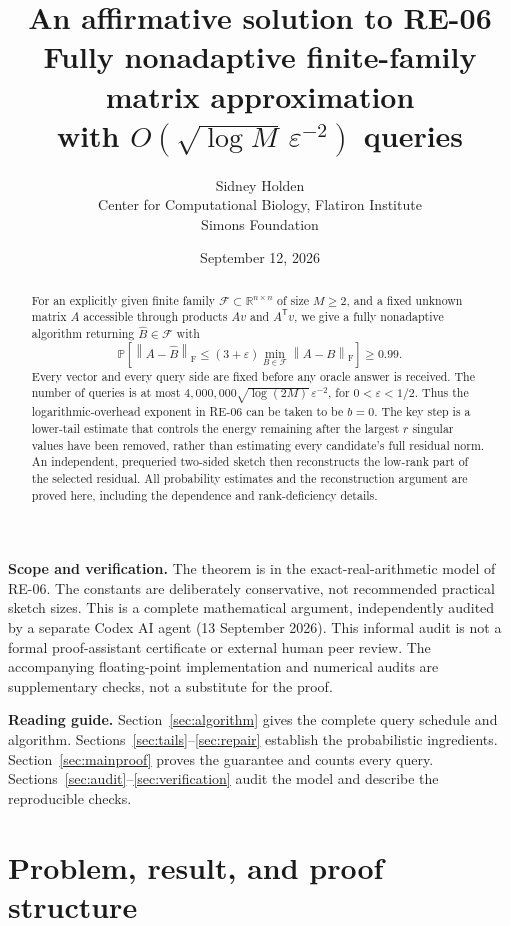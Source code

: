 \documentclass[11pt]{article}
\title{\vspace{-1.5em}\textbf{An affirmative solution to RE-06}\\[0.4em]\large Fully nonadaptive finite-family matrix approximation\\with $O(\sqrt{\log M}\,\varepsilon^{-2})$ queries}
\author{Sidney Holden\\[0.3em]\small Center for Computational Biology, Flatiron Institute\\\small Simons Foundation}
\date{September 12, 2026}
\numberwithin{equation}{section}
\theoremstyle{remark}
\newcommand{\R}{\mathbb R}
\newcommand{\Prob}{\mathbb P}
\newcommand{\F}{\mathcal F}
\newcommand{\norm}[1]{\left\lVert #1\right\rVert_{\mathrm F}}
\newcommand{\T}{\mathsf T}
\begin{document}
\maketitle
\thispagestyle{empty}
\begin{abstract}
For an explicitly given finite family $\F\subset\R^{n\times n}$ of size $M\ge2$, and a fixed unknown matrix $A$ accessible through products $Av$ and $A^\T v$, we give a fully nonadaptive algorithm returning $\widehat B\in\F$ with
\[
 \Prob\!\left[\norm{A-\widehat B}\le(3+\varepsilon)
             \min_{B\in\F}\norm{A-B}\right]\ge0.99.
\]
Every vector and every query side are fixed before any oracle answer is received. The number of queries is at most
$4{,}000{,}000\sqrt{\log(2M)}\,\varepsilon^{-2}$, for $0<\varepsilon<1/2$.
Thus the logarithmic-overhead exponent in RE-06 can be taken to be $b=0$.
The key step is a lower-tail estimate that controls the energy remaining after the largest $r$ singular values have been removed, rather than estimating every candidate's full residual norm. An independent, prequeried two-sided sketch then reconstructs the low-rank part of the selected residual. All probability estimates and the reconstruction argument are proved here, including the dependence and rank-deficiency details.
\end{abstract}

\vspace{0.4em}
\noindent\textbf{Scope and verification.}
The theorem is in the exact-real-arithmetic model of RE-06. The constants are deliberately conservative, not recommended practical sketch sizes. This is a complete mathematical argument, independently audited by a separate Codex AI agent (13 September 2026). This informal audit is not a formal proof-assistant certificate or external human peer review. The accompanying floating-point implementation and numerical audits are supplementary checks, not a substitute for the proof.

\vspace{0.4em}
\noindent\textbf{Reading guide.}
Section~\ref{sec:algorithm} gives the complete query schedule and algorithm.
Sections~\ref{sec:tails}--\ref{sec:repair} establish the probabilistic ingredients.
Section~\ref{sec:mainproof} proves the guarantee and counts every query.
Sections~\ref{sec:audit}--\ref{sec:verification} audit the model and describe the reproducible checks.

\newpage
\section{Problem, result, and proof structure}\label{sec:problem}
\end{document}
